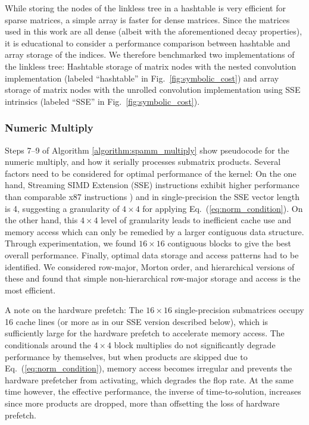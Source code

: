 While storing the nodes of the linkless tree in a hashtable is very efficient
for sparse matrices, a simple array is faster for dense matrices. Since the
matrices used in this work are all dense (albeit with the aforementioned decay
properties), it is educational to consider a performance comparison between
hashtable and array storage of the indices. We therefore benchmarked two
implementations of the linkless tree: Hashtable storage of matrix nodes with
the nested convolution implementation (labeled ``hashtable'' in
Fig.~\ref{fig:symbolic_cost}) and array storage of matrix nodes with the
unrolled convolution implementation using SSE intrinsics (labeled ``SSE'' in
Fig.~\ref{fig:symbolic_cost}).

\subsubsection{Numeric Multiply}
\label{sec:fast_kernel}

Steps 7--9 of Algorithm \ref{algorithm:spamm_multiply} show pseudocode for the
numeric multiply, and how it serially processes submatrix products.  Several
factors need to be considered for optimal performance of the kernel: On the
one hand, Streaming SIMD Extension (SSE) instructions exhibit higher
performance than comparable x87 instructions \cite[Sec.~3.8.4]{Intel2009}) and
in single-precision the SSE vector length is 4, suggesting a granularity of $4
\times 4$ for applying Eq.~(\ref{eq:norm_condition}).  On the other hand, this
$4 \times 4$ level of granularity leads to inefficient cache use and memory
access which can only be remedied by a larger contiguous data structure.
Through experimentation, we found $16 \times 16$ contiguous blocks to give the
best overall performance. Finally, optimal data storage and access patterns
had to be identified. We considered row-major, Morton order, and hierarchical
versions of these and found that simple non-hierarchical row-major storage and
access is the most efficient.

A note on the hardware prefetch: The $16 \times 16$ single-precision
submatrices occupy 16 cache lines (or more as in our SSE version described
below), which is sufficiently large for the hardware prefetch to accelerate
memory access. The conditionals around the $4 \times 4$ block multiplies do not
significantly degrade performance by themselves, but when products are skipped
due to Eq.~(\ref{eq:norm_condition}), memory access becomes irregular and
prevents the hardware prefetcher from activating, which degrades the flop rate.
At the same time however, the effective performance, the inverse of
time-to-solution, increases since more products are dropped, more than
offsetting the loss of hardware prefetch.

